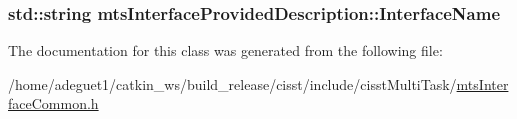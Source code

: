 \hypertarget{classmts_interface_provided_description_a9d0b2061eb25931296b5d0b55b7147c0}{
\subsubsection[{Interface\-Name}]{\setlength{\rightskip}{0pt plus 5cm}std\-::string mts\-Interface\-Provided\-Description\-::\-Interface\-Name}}\label{classmts_interface_provided_description_a9d0b2061eb25931296b5d0b55b7147c0}


The documentation for this class was generated from the following file\-:\begin{DoxyCompactItemize}
\item 
/home/adeguet1/catkin\-\_\-ws/build\-\_\-release/cisst/include/cisst\-Multi\-Task/\hyperlink{mts_interface_common_8h}{mts\-Interface\-Common.\-h}\end{DoxyCompactItemize}
